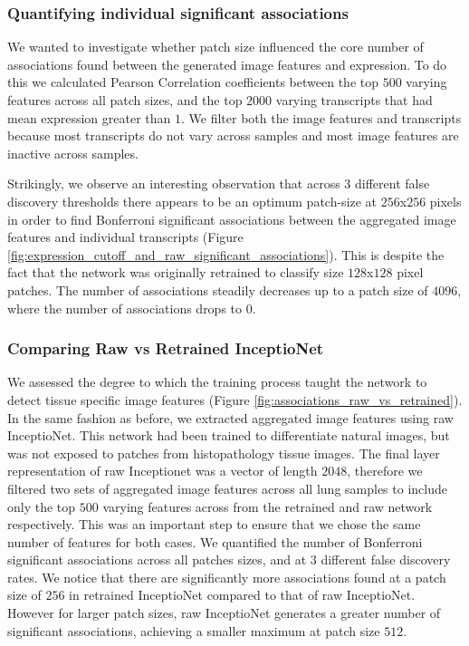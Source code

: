 \documentclass[graybox]{svmult}
\begin{document}
\subsubsection{Quantifying individual significant associations}

We wanted to investigate whether patch size influenced the core number of associations found between the generated image features and expression. To do this we calculated Pearson Correlation coefficients between the top $500$ varying features across all patch sizes, and the top $2000$ varying transcripts that had mean expression greater than $1$. We filter both the image features and transcripts because most transcripts do not vary across samples and most image features are inactive across samples. 

Strikingly, we observe an interesting observation that across $3$ different false discovery thresholds there appears to be an optimum patch-size at $256$x$256$ pixels in order to find Bonferroni significant associations between the aggregated image features and individual transcripts (Figure \ref{fig:expression_cutoff_and_raw_significant_associations}). This is despite the fact that the network was originally retrained to classify size $128$x$128$ pixel patches. The number of associations steadily decreases up to a patch size of $4096$, where the number of associations drops to $0$.

\subsubsection{Comparing Raw vs Retrained InceptioNet}

We assessed the degree to which the training process taught the network to detect tissue specific image features (Figure \ref{fig:associations_raw_vs_retrained}). In the same fashion as before, we extracted aggregated image features using raw InceptioNet. This network had been trained to differentiate natural images, but was not exposed to patches from histopathology tissue images. The final layer representation of raw Inceptionet was a vector of length $2048$, therefore we filtered two sets of aggregated image features across all lung samples to include only the top $500$ varying features across from the retrained and raw network respectively. This was an important step to ensure that we chose the same number of features for both cases. We quantified the number of Bonferroni significant associations across all patches sizes, and at $3$ different false discovery rates. We notice that there are significantly more associations found at a patch size of $256$ in retrained InceptioNet compared to that of raw InceptioNet. However for larger patch sizes, raw InceptioNet generates a greater number of significant associations, achieving a smaller maximum at patch size $512$.
\end{document}
